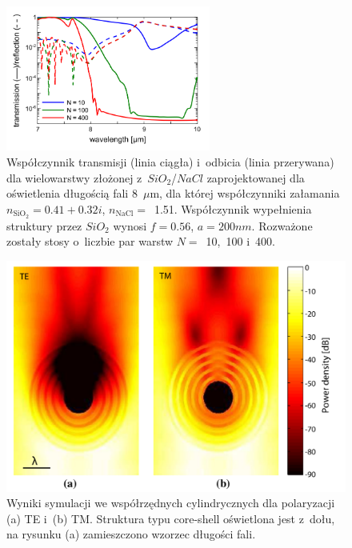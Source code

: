 \begin{figure}[tb]
	\centering
	\includegraphics[width=0.6\textwidth]{images/pml/oqe_trans_refl.png}
	\caption{Współczynnik transmisji (linia ciągła) i~odbicia (linia przerywana) dla wielowarstwy złożonej z~$SiO_2$/$NaCl$ zaprojektowanej dla oświetlenia długością fali 8~$\mu$m, dla której współczynniki załamania $n_{\textrm{SiO}_2}=0.41+0.32i$, $n_{\textrm{NaCl}}=$~1.51. Współczynnik wypełnienia struktury przez $SiO_2$ wynosi $f=0.56$, $a=200nm$. Rozważone zostały stosy o~liczbie par warstw $N=$~10,~100 i~400.}
	\label{fig:oqe-trans-refl}
\end{figure}

\begin{figure}[tb]
	\includegraphics[width=\textwidth]{images/pml/oqe_coreshell.png}
	\caption{Wyniki symulacji we współrzędnych cylindrycznych dla polaryzacji (a) TE i~(b) TM. Struktura typu core-shell oświetlona jest z~dołu, na rysunku (a) zamieszczono wzorzec długości fali.}
	\label{fig:oqecoreshell}
\end{figure}


